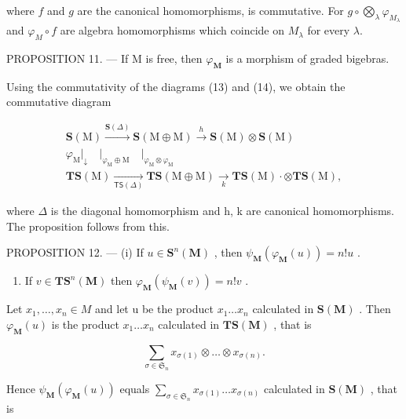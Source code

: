 where \(f\) and \(g\) are the canonical homomorphisms, is commutative. For \(g \circ \bigotimes_{\lambda} \varphi_{M_{\lambda}}\) and \(\varphi_{M} \circ f\) are algebra homomorphisms which coincide on \(M_{\lambda}\) for every \(\lambda\).

PROPOSITION 11. --- If M is free, then \(\varphi_{\mathbf{M}}\) is a morphism of graded bigebras.

Using the commutativity of the diagrams (13) and (14), we obtain the commutative diagram

\[
\begin{array}{l} \mathbf {S} (\mathrm{M}) \xrightarrow {\mathbf {S} (\Delta)} \mathbf {S} (\mathrm{M} \oplus \mathrm{M}) \xrightarrow {h} \mathbf {S} (\mathrm{M}) \otimes \mathbf {S} (\mathrm{M}) \\ \varphi_ {\mathrm{M}} \Bigg | _ {\downarrow} \quad \Bigg | _ {\varphi_ {\mathrm{M}} \oplus \mathrm{M}} \quad \Bigg | _ {\varphi_ {\mathrm{M}} \otimes \varphi_ {\mathrm{M}}} \\ \mathbf {T S} (\mathrm{M}) \xrightarrow [ \mathsf {T S} (\Delta) ]{} \mathbf {T S} (\mathrm{M} \oplus \mathrm{M}) \xrightarrow [ k ]{} \mathbf {T S} (\mathrm{M}) \cdot \otimes \mathbf {T S} (\mathrm{M}), \end{array}
\]

where \(\Delta\) is the diagonal homomorphism and h, k are canonical homomorphisms. The proposition follows from this.

PROPOSITION 12. --- (i) If \(u \in \mathbf{S}^n(\mathbf{M})\) , then \(\psi_{\mathbf{M}}(\varphi_{\mathbf{M}}(u)) = n!u\) .

\begin{enumerate}
\def\labelenumi{(\roman{enumi})}
\setcounter{enumi}{1}
\tightlist
\item
  If \(v \in \mathbf{T}\mathbf{S}^n(\mathbf{M})\) then \(\varphi_{\mathbf{M}}(\psi_{\mathbf{M}}(v)) = n!v\) .
\end{enumerate}

Let \(x_{1}, \ldots, x_{n} \in M\) and let u be the product \(x_{1} \ldots x_{n}\) calculated in \(\mathbf{S}(\mathbf{M})\) . Then \(\varphi_{\mathbf{M}}(u)\) is the product \(x_{1} \ldots x_{n}\) calculated in \(\mathbf{T}\mathbf{S}(\mathbf{M})\) , that is

\[
\sum_ {\sigma \in \mathfrak {S} _ {n}} x _ {\sigma (1)} \otimes \dots \otimes x _ {\sigma (n)}.
\]

Hence \(\psi_{\mathbf{M}}(\varphi_{\mathbf{M}}(u))\) equals \(\sum_{\sigma \in \mathfrak{S}_n}x_{\sigma (1)}\ldots x_{\sigma (n)}\) calculated in \(\mathbf{S}(\mathbf{M})\) , that is

